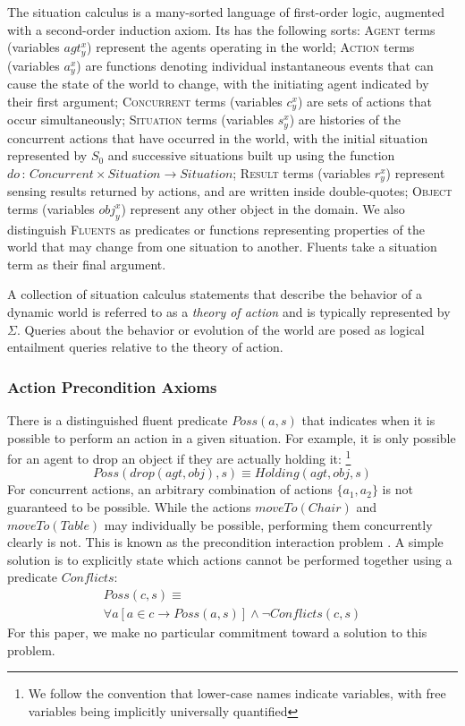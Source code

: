 \documentclass[letterpaper]{article}
\newcommand{\noun}[1]{\textsc{#1}}
\begin{document}
The situation calculus is a many-sorted language of first-order logic,
augmented with a second-order induction axiom. Its has the following
sorts: \noun{Agent} terms (variables $agt_{y}^{x}$) represent the
agents operating in the world; \noun{Action} terms (variables $a_{y}^{x}$)
are functions denoting individual instantaneous events that can cause
the state of the world to change, with the initiating agent indicated
by their first argument; \noun{Concurrent} terms (variables $c_{y}^{x}$)
are sets of actions that occur simultaneously; \noun{Situation} terms
(variables $s_{y}^{x}$) are histories of the concurrent actions that
have occurred in the world, with the initial situation represented
by $S_{0}$ and successive situations built up using the function
$do\,:\, Concurrent\times Situation\rightarrow Situation$; \noun{Result}
terms (variables $r_{y}^{x}$) represent sensing results returned
by actions, and are written inside double-quotes; \noun{Object} terms
(variables $obj_{y}^{x}$) represent any other object in the domain.
We also distinguish \noun{Fluents} as predicates or functions representing
properties of the world that may change from one situation to another.
Fluents take a situation term as their final argument.

A collection of situation calculus statements that describe the behavior
of a dynamic world is referred to as a \emph{theory of action} and
is typically represented by $\Sigma$. Queries about the behavior
or evolution of the world are posed as logical entailment queries
relative to the theory of action.


\subsubsection{Action Precondition Axioms}

There is a distinguished fluent predicate $Poss(a,s)$ that indicates
when it is possible to perform an action in a given situation. For
example, it is only possible for an agent to drop an object if they
are actually holding it:
\footnote{We follow the convention that lower-case names indicate variables,
with free variables being implicitly universally quantified %
}
\begin{equation*}
Poss(drop(agt,obj),s)\equiv Holding(agt,obj,s)
\end{equation*}
For concurrent actions, an arbitrary combination of actions $\{ a_{1},a_{2}\}$
is not guaranteed to be possible. While the actions $moveTo(Chair)$
and $moveTo(Table)$ may individually be possible, performing them
concurrently clearly is not. This is known as the precondition interaction
problem \cite{reiter96sc_nat_conc}. A simple solution is to explicitly
state which actions cannot be performed together using a predicate
$Conflicts$:
\begin{multline*}
Poss(c,s)\equiv\\
\forall a\left[a\in c\rightarrow Poss(a,s)\right]\wedge\neg Conflicts(c,s)
\end{multline*}
For this paper, we make no particular commitment toward a solution
to this problem.
\end{document}
